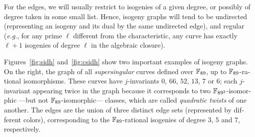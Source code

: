 \begin{otherlanguage}{english}
  For the edges, we will usually restrict to isogenies of a given
  degree, or possibly of degree taken in some small list. Hence,
  isogeny graphs will tend to be undirected (representing an isogeny
  and its dual by the same undirected edge), and regular (\emph{e.g.},
  for any prime $\ell$ different from the characteristic, any curve
  has exactly $\ell+1$ isogenies of degree $\ell$ in the algebraic
  closure).

  Figures~\ref{fig:sidh} and~\ref{fig:csidh} show two important
  examples of isogeny graphs. On the right, the graph of all
  \emph{supersingular} curves defined over $\mathbb{F}_{89}$, up to
  $\mathbb{F}_{89}$-rational isomorphisms. These curves have $j$-invariants
  $0$, $66$, $52$, $13$, $7$ or $6$; each $j$-invariant appearing
  twice in the graph because it corresponds to two
  $\mathbb{F}_{89^2}$-isomorphic ---but not $\mathbb{F}_{89}$-isomorphic--- classes,
  which are called \emph{quadratic twists} of one another. The edges
  are the union of three distinct edge sets (represented by different
  colors), corresponding to the $\mathbb{F}_{89}$-rational isogenies of degree
  $3$, $5$ and $7$, respectively.

  \begin{figure}
    \centering
    \begin{minipage}{0.47\textwidth}
      \centering
\end{minipage}
\end{figure}
\end{otherlanguage}
